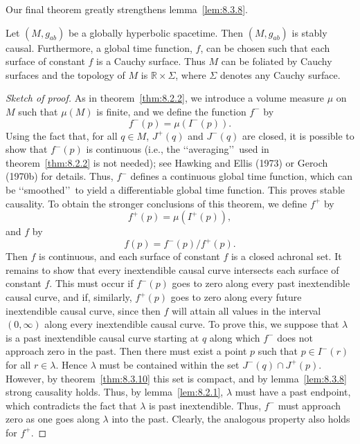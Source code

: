 Our final theorem greatly strengthens lemma~\ref{lem:8.3.8}.

\begin{theorem}\label{thm:8.3.14}
Let \((M,g_{ab})\) be a globally hyperbolic spacetime. Then \((M,g_{ab})\) is
stably causal. Furthermore, a global time function, \(f\), can be chosen such that
each surface of constant \(f\) is a Cauchy surface. Thus \(M\) can be foliated by
Cauchy surfaces and the topology of \(M\) is \(\mathbb{R}\times\Sigma\), where
\(\Sigma\) denotes any Cauchy surface.
\end{theorem}
\begin{proof}[Sketch of proof]
As in theorem~\ref{thm:8.2.2}, we introduce a volume measure \(\mu\) on \(M\) such
that \(\mu(M)\) is finite, and we define the function \(f^-\) by
\begin{equation}
  f^-(p)=\mu(I^-(p)).
  \tag{8.3.8}\label{eq:8.3.8}
\end{equation}
Using the fact that, for all \(q\in M\), \(J^+(q)\) and \(J^-(q)\) are closed, it
is possible to show that \(f^-(p)\) is continuous (i.e., the \lq\lq averaging\rq\rq\
used in theorem~\ref{thm:8.2.2} is not needed); see Hawking and Ellis (1973) or
Geroch (1970b) for details. Thus, \(f^-\) defines a continuous global time function,
which can be \lq\lq smoothed\rq\rq\ to yield a differentiable global time function.
This proves stable causality. To obtain the stronger conclusions of this theorem, we
define \(f^+\) by
\begin{equation}
  f^+(p)=\mu(I^+(p)),
  \tag{8.3.9}\label{eq:8.3.9}
\end{equation}
and \(f\) by
\begin{equation}
  f(p)=f^-(p)/f^+(p).
  \tag{8.3.10}\label{eq:8.3.10}
\end{equation}
Then \(f\) is continuous, and each surface of constant \(f\) is a closed achronal
set. It remains to show that every inextendible causal curve intersects each surface
of constant \(f\). This must occur if \(f^-(p)\) goes to zero along every past
inextendible causal curve, and if, similarly, \(f^+(p)\) goes to zero along every
future inextendible causal curve, since then \(f\) will attain all values in the
interval \((0,\infty)\) along every inextendible causal curve. To prove this, we
suppose that \(\lambda\) is a past inextendible causal curve starting at \(q\) along
which \(f^-\) does not approach zero in the past. Then there must exist a point
\(p\) such that \(p\in I^-(r)\) for all \(r\in\lambda\). Hence \(\lambda\) must be
contained within the set \(J^-(q)\cap J^+(p)\). However, by
theorem~\ref{thm:8.3.10} this set is compact, and by lemma~\ref{lem:8.3.8} strong
causality holds. Thus, by lemma~\ref{lem:8.2.1}, \(\lambda\) must have a past
endpoint, which contradicts the fact that \(\lambda\) is past inextendible. Thus,
\(f^-\) must approach zero as one goes along \(\lambda\) into the past. Clearly,
the analogous property also holds for \(f^+\).
\end{proof}

